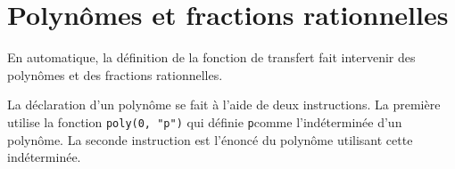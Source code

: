 \section{Polynômes et fractions rationnelles}
En automatique, la définition de la fonction de transfert 
fait intervenir des polynômes et des fractions rationnelles.

La déclaration d'un polynôme se fait à l'aide de deux instructions. 
La première utilise la fonction \verb?poly(0, "p")? qui définie 
\og \verb?p?\fg comme l'indéterminée d'un polynôme. 
La seconde instruction est l'énoncé du polynôme utilisant cette indéterminée. 
